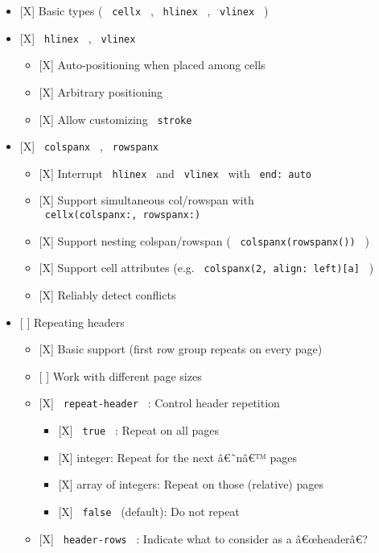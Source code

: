 \begin{itemize}
  \begin{itemize}
  \tightlist
  \item
    {[}X{]} Basic types ( \texttt{\ cellx\ } , \texttt{\ hlinex\ } ,
    \texttt{\ vlinex\ } )
  \item
    {[}X{]} \texttt{\ hlinex\ } , \texttt{\ vlinex\ }

    \begin{itemize}
    \tightlist
    \item
      {[}X{]} Auto-positioning when placed among cells
    \item
      {[}X{]} Arbitrary positioning
    \item
      {[}X{]} Allow customizing \texttt{\ stroke\ }
    \end{itemize}
  \item
    {[}X{]} \texttt{\ colspanx\ } , \texttt{\ rowspanx\ }

    \begin{itemize}
    \tightlist
    \item
      {[}X{]} Interrupt \texttt{\ hlinex\ } and \texttt{\ vlinex\ } with
      \texttt{\ end:\ auto\ }
    \item
      {[}X{]} Support simultaneous col/rowspan with
      \texttt{\ cellx(colspanx:,\ rowspanx:)\ }
    \item
      {[}X{]} Support nesting colspan/rowspan (
      \texttt{\ colspanx(rowspanx())\ } )
    \item
      {[}X{]} Support cell attributes (e.g.
      \texttt{\ colspanx(2,\ align:\ left){[}a{]}\ } )
    \item
      {[}X{]} Reliably detect conflicts
    \end{itemize}
  \item
    {[} {]} Repeating headers

    \begin{itemize}
    \tightlist
    \item
      {[}X{]} Basic support (first row group repeats on every page)
    \item
      {[} {]} Work with different page sizes
    \item
      {[}X{]} \texttt{\ repeat-header\ } : Control header repetition

      \begin{itemize}
      \tightlist
      \item
        {[}X{]} \texttt{\ true\ } : Repeat on all pages
      \item
        {[}X{]} integer: Repeat for the next â€˜nâ€™ pages
      \item
        {[}X{]} array of integers: Repeat on those (relative) pages
      \item
        {[}X{]} \texttt{\ false\ } (default): Do not repeat
      \end{itemize}
    \item
      {[}X{]} \texttt{\ header-rows\ } : Indicate what to consider as a
      â€œheaderâ€?


\end{itemize}
\end{itemize}
\end{itemize}

